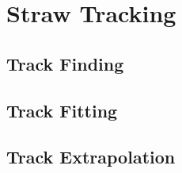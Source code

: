 \chapter{Straw Tracking}
\label{chapter:Straw Tracking}
\thispagestyle{myheadings} %

\section{Track Finding}
\label{sec:Track Finding}

\section{Track Fitting}
\label{sec:Track Fitting}

\section{Track Extrapolation}
\label{sec:Track Extrapolation}
